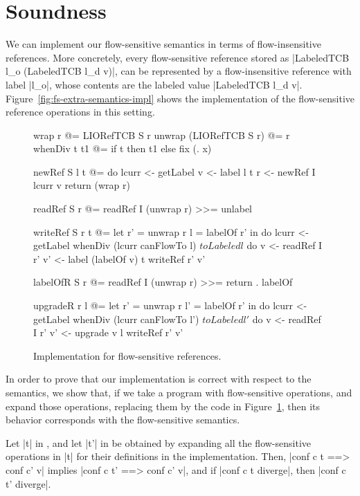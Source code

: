\section{Soundness}
\label{sec:soundness}

We can implement our flow-sensitive semantics in terms of
flow-insensitive references. More concretely, every flow-sensitive
reference stored as |LabeledTCB l_o (LabeledTCB l_d v)|, can be
represented by a flow-insensitive reference with label |l_o|, whose
contents are the labeled value |LabeledTCB l_d
v|. Figure~\ref{fig:fs-extra-semantics-impl} shows the implementation
of the flow-sensitive reference operations in this setting.

\begin{figure}
\small
\begin{code}
wrap r @= LIORefTCB S r
unwrap (LIORefTCB S r) @= r
whenDiv t t1 @= if t then t1 else fix (\x. x)

newRef S l t @= do
  lcurr  <- getLabel
  v      <- label l t
  r      <- newRef I lcurr v
  return (wrap r)


readRef S r @= readRef I (unwrap r) >>= unlabel


writeRef S r t @= let  r'  = unwrap r
                       l   = labelOf r' in do
  lcurr <- getLabel
  whenDiv (lcurr canFlowTo l) $ toLabeled l $ do
     v   <- readRef I r'
     v'  <- label (labelOf v) t
     writeRef r' v'


labelOfR S r @= readRef I (unwrap r) >>= return . labelOf

upgradeR r l @= let  r'  = unwrap r
                     l'  = labelOf r' in do
  lcurr <- getLabel
  whenDiv (lcurr canFlowTo l') $ toLabeled l' $ do
     v   <- readRef I r'
     v'  <- upgrade v l
     writeRef r' v'

\end{code}
\caption{Implementation for flow-sensitive references.\label{fig:fs-exts-semantics-impl}}
\end{figure}

In order to prove that our implementation is correct with respect to
the semantics, we show that, if we take a program with flow-sensitive
operations, and expand those operations, replacing them by the code in
Figure~\ref{fig:fs-exts-semantics-impl}, then its behavior corresponds
with the flow-sensitive semantics.

\begin{theorem}\label{thm:eq} Let |t| in \liofs{}, and let |t'| in \lio{} be
  obtained by expanding all the flow-sensitive operations in |t| for
  their definitions in the implementation. Then, |conf c t ==> conf
  c' v| implies |conf c t' ==> conf c' v|, and if |conf c t diverge|,
  then |conf c t' diverge|.
\end{theorem}

